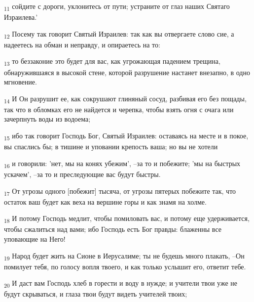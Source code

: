 \begin{tcolorbox}
\textsubscript{11} сойдите с дороги, уклонитесь от пути; устраните от глаз наших Святаго Израилева.'
\end{tcolorbox}
\begin{tcolorbox}
\textsubscript{12} Посему так говорит Святый Израилев: так как вы отвергаете слово сие, а надеетесь на обман и неправду, и опираетесь на то:
\end{tcolorbox}
\begin{tcolorbox}
\textsubscript{13} то беззаконие это будет для вас, как угрожающая падением трещина, обнаружившаяся в высокой стене, которой разрушение настанет внезапно, в одно мгновение.
\end{tcolorbox}
\begin{tcolorbox}
\textsubscript{14} И Он разрушит ее, как сокрушают глиняный сосуд, разбивая его без пощады, так что в обломках его не найдется и черепка, чтобы взять огня с очага или зачерпнуть воды из водоема;
\end{tcolorbox}
\begin{tcolorbox}
\textsubscript{15} ибо так говорит Господь Бог, Святый Израилев: оставаясь на месте и в покое, вы спаслись бы; в тишине и уповании крепость ваша; но вы не хотели
\end{tcolorbox}
\begin{tcolorbox}
\textsubscript{16} и говорили: 'нет, мы на конях убежим', --за то и побежите; 'мы на быстрых ускачем', --за то и преследующие вас будут быстры.
\end{tcolorbox}
\begin{tcolorbox}
\textsubscript{17} От угрозы одного [побежит] тысяча, от угрозы пятерых побежите так, что остаток ваш будет как веха на вершине горы и как знамя на холме.
\end{tcolorbox}
\begin{tcolorbox}
\textsubscript{18} И потому Господь медлит, чтобы помиловать вас, и потому еще удерживается, чтобы сжалиться над вами; ибо Господь есть Бог правды: блаженны все уповающие на Него!
\end{tcolorbox}
\begin{tcolorbox}
\textsubscript{19} Народ будет жить на Сионе в Иерусалиме; ты не будешь много плакать, --Он помилует тебя, по голосу вопля твоего, и как только услышит его, ответит тебе.
\end{tcolorbox}
\begin{tcolorbox}
\textsubscript{20} И даст вам Господь хлеб в горести и воду в нужде; и учители твои уже не будут скрываться, и глаза твои будут видеть учителей твоих;
\end{tcolorbox}
